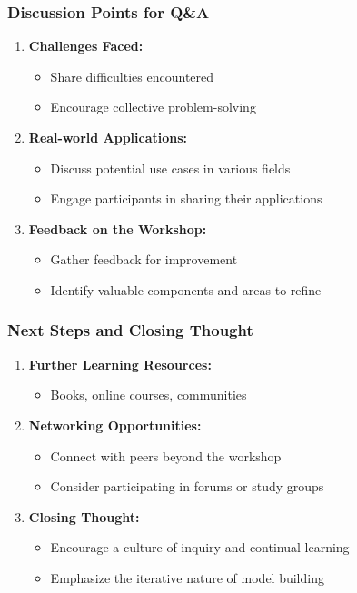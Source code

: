 \documentclass{beamer}
\begin{document}
\begin{frame}[fragile]
    \frametitle{Discussion Points for Q\&A}
    \begin{enumerate}
        \item \textbf{Challenges Faced:} 
        \begin{itemize}
            \item Share difficulties encountered 
            \item Encourage collective problem-solving
        \end{itemize}
        
        \item \textbf{Real-world Applications:}
        \begin{itemize}
            \item Discuss potential use cases in various fields
            \item Engage participants in sharing their applications
        \end{itemize}
        
        \item \textbf{Feedback on the Workshop:}
        \begin{itemize}
            \item Gather feedback for improvement
            \item Identify valuable components and areas to refine
        \end{itemize}
    \end{enumerate}
\end{frame}

\begin{frame}[fragile]
    \frametitle{Next Steps and Closing Thought}
    \begin{enumerate}
        \item \textbf{Further Learning Resources:} 
        \begin{itemize}
            \item Books, online courses, communities
        \end{itemize}
        
        \item \textbf{Networking Opportunities:} 
        \begin{itemize}
            \item Connect with peers beyond the workshop
            \item Consider participating in forums or study groups
        \end{itemize}
        
        \item \textbf{Closing Thought:} 
        \begin{itemize}
            \item Encourage a culture of inquiry and continual learning
            \item Emphasize the iterative nature of model building
        \end{itemize}
    \end{enumerate}
\end{frame}
\end{document}
